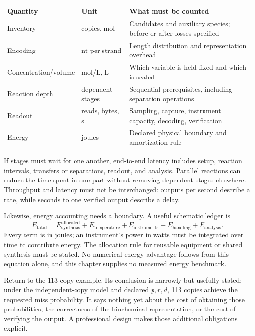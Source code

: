 \begin{center}\small
\begin{tabular}{p{.22\linewidth}p{.22\linewidth}p{.46\linewidth}}
\toprule Quantity & Unit & What must be counted\\\midrule
Inventory & copies, mol & Candidates and auxiliary species; before or after losses specified\\
Encoding & nt per strand & Length distribution and representation overhead\\
Concentration/volume & mol/L, L & Which variable is held fixed and which is scaled\\
Reaction depth & dependent stages & Sequential prerequisites, including separation operations\\
Readout & reads, bytes, s & Sampling, capture, instrument capacity, decoding, verification\\
Energy & joules & Declared physical boundary and amortization rule\\\bottomrule
\end{tabular}
\end{center}

If stages must wait for one another, end-to-end latency includes setup, reaction intervals, transfers or separations, readout, and analysis. Parallel reactions can reduce the time spent in one part without removing dependent stages elsewhere. Throughput and latency must not be interchanged: outputs per second describe a rate, while seconds to one verified output describe a delay.

Likewise, energy accounting needs a boundary. A useful schematic ledger is
\begin{equation}
E_{\mathrm{total}}=E_{\mathrm{synthesis}}^{\mathrm{allocated}}
+E_{\mathrm{temperature}}+E_{\mathrm{instruments}}
+E_{\mathrm{handling}}+E_{\mathrm{analysis}}.
\end{equation}
Every term is in joules; an instrument's power in watts must be integrated over time to contribute energy. The allocation rule for reusable equipment or shared synthesis must be stated. No numerical energy advantage follows from this equation alone, and this chapter supplies no measured energy benchmark.

Return to the 113-copy example. Its conclusion is narrowly but usefully stated: under the independent-copy model and declared $p,r,d$, 113 copies achieve the requested miss probability. It says nothing yet about the cost of obtaining those probabilities, the correctness of the biochemical representation, or the cost of verifying the output. A professional design makes those additional obligations explicit.

